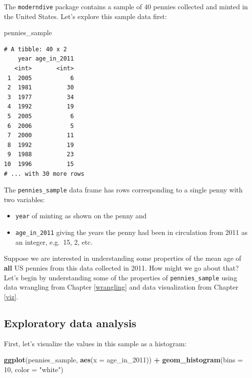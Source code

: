 \documentclass[12pt,]{krantz}
\makeatletter
\newenvironment{Shaded}{\begin{snugshade}}{\end{snugshade}}
\newcommand{\KeywordTok}[1]{\textcolor[rgb]{0.27,0.27,0.27}{\textbf{#1}}}
\newcommand{\DataTypeTok}[1]{\textcolor[rgb]{0.27,0.27,0.27}{#1}}
\newcommand{\DecValTok}[1]{\textcolor[rgb]{0.06,0.06,0.06}{#1}}
\newcommand{\StringTok}[1]{\textcolor[rgb]{0.5,0.5,0.5}{#1}}
\newcommand{\OperatorTok}[1]{\textcolor[rgb]{0.43,0.43,0.43}{\textbf{#1}}}
\newcommand{\NormalTok}[1]{#1}
\providecommand{\tightlist}{%
  \setlength{\itemsep}{0pt}\setlength{\parskip}{0pt}}
\newenvironment{kframe}{%
\medskip{}
\setlength{\fboxsep}{.8em}
 \def\at@end@of@kframe{}%
 \ifinner\ifhmode%
  \def\at@end@of@kframe{\end{minipage}}%
  \begin{minipage}{\columnwidth}%
 \fi\fi%
 \def\FrameCommand##1{\hskip\@totalleftmargin \hskip-\fboxsep
 \colorbox{shadecolor}{##1}\hskip-\fboxsep
     \hskip-\linewidth \hskip-\@totalleftmargin \hskip\columnwidth}%
 \MakeFramed {\advance\hsize-\width
   \@totalleftmargin\z@ \linewidth\hsize
   \@setminipage}}%
 {\par\unskip\endMakeFramed%
 \at@end@of@kframe}
\renewenvironment{Shaded}{\begin{kframe}}{\end{kframe}}
\theoremstyle{definition}
\theoremstyle{definition}
\theoremstyle{definition}
\theoremstyle{remark}
\makeatother
\begin{document}
The \texttt{moderndive} package contains a sample of 40 pennies
collected and minted in the United States. Let's explore this sample
data first:

\begin{Shaded}
\begin{Highlighting}[]
\NormalTok{pennies_sample}
\end{Highlighting}
\end{Shaded}

\begin{verbatim}
# A tibble: 40 x 2
    year age_in_2011
   <int>       <int>
 1  2005           6
 2  1981          30
 3  1977          34
 4  1992          19
 5  2005           6
 6  2006           5
 7  2000          11
 8  1992          19
 9  1988          23
10  1996          15
# ... with 30 more rows
\end{verbatim}

The \texttt{pennies\_sample} data frame has rows corresponding to a
single penny with two variables:

\begin{itemize}
\tightlist
\item
  \texttt{year} of minting as shown on the penny and
\item
  \texttt{age\_in\_2011} giving the years the penny had been in
  circulation from 2011 as an integer, e.g.~15, 2, etc.
\end{itemize}

Suppose we are interested in understanding some properties of the mean
age of \textbf{all} US pennies from this data collected in 2011. How
might we go about that? Let's begin by understanding some of the
properties of \texttt{pennies\_sample} using data wrangling from Chapter
\ref{wrangling} and data visualization from Chapter \ref{viz}.

\subsection{Exploratory data analysis}\label{exploratory-data-analysis}

First, let's visualize the values in this sample as a histogram:

\begin{Shaded}
\begin{Highlighting}[]
\KeywordTok{ggplot}\NormalTok{(pennies_sample, }\KeywordTok{aes}\NormalTok{(}\DataTypeTok{x =}\NormalTok{ age_in_}\DecValTok{2011}\NormalTok{)) }\OperatorTok{+}
\StringTok{  }\KeywordTok{geom_histogram}\NormalTok{(}\DataTypeTok{bins =} \DecValTok{10}\NormalTok{, }\DataTypeTok{color =} \StringTok{"white"}\NormalTok{)}
\end{Highlighting}
\end{Shaded}
\end{document}
